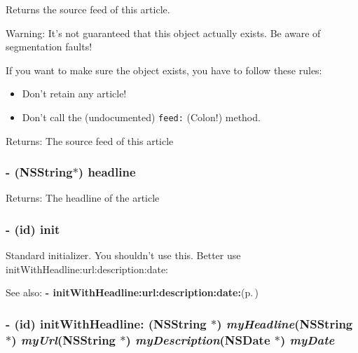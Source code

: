 Returns the source feed of this article.

\begin{Desc}
\item[Warning:]It's not guaranteed that this object actually exists. Be aware of segmentation faults!\end{Desc}
If you want to make sure the object exists, you have to follow these rules:

\begin{itemize}
\item Don't retain any article! \item Don't call the (undocumented) {\tt feed:} (Colon!) method. \end{itemize}


\begin{Desc}
\item[Returns:]The source feed of this article\end{Desc}
\subsubsection{\setlength{\rightskip}{0pt plus 5cm}- (NSString$\ast$) headline }\label{interfaceRSSArticle_a6}


\begin{Desc}
\item[Returns:]The headline of the article \end{Desc}
\subsubsection{\setlength{\rightskip}{0pt plus 5cm}- (id) init }\label{interfaceRSSArticle_a0}


Standard initializer. You shouldn't use this. Better use init\-With\-Headline:url:description:date:

\begin{Desc}
\item[See also:]{\bf - init\-With\-Headline:url:description:date:}{\rm (p.\,\pageref{interfaceRSSArticle_a1})}\end{Desc}
\subsubsection{\setlength{\rightskip}{0pt plus 5cm}- (id) init\-With\-Headline: (NSString $\ast$) {\em my\-Headline}(NSString $\ast$) {\em my\-Url}(NSString $\ast$) {\em my\-Description}(NSDate $\ast$) {\em my\-Date}}\label{interfaceRSSArticle_a1}


